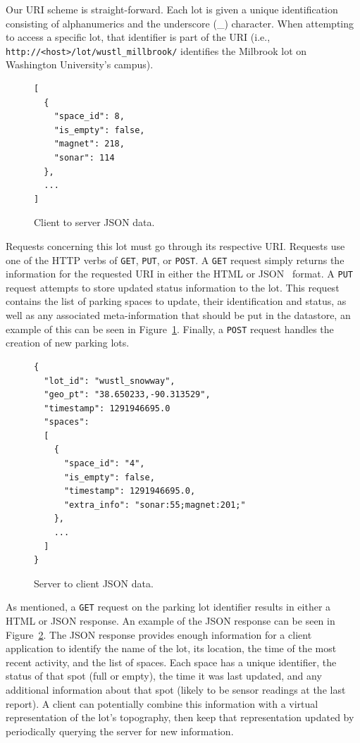 \documentclass{acm_proc}
\begin{document}
Our URI scheme is straight-forward.
Each lot is given a unique identification consisting of alphanumerics and
the underscore (\_) character.
When attempting to access a specific lot, that identifier is part of the
URI (i.e.,
\texttt{http://<host>/lot/wustl\_millbrook/}
identifies the Milbrook lot on Washington University's campus).

\begin{figure}
    \begin{verbatim}
[
  {
    "space_id": 8,
    "is_empty": false,
    "magnet": 218,
    "sonar": 114
  },
  ...
]
\end{verbatim}
	\caption{Client to server JSON data.}
	\label{fig:clientserverjson}
\end{figure}

Requests concerning this lot must go through its respective URI.
Requests use one of the HTTP verbs of \texttt{GET}, \texttt{PUT}, or
\texttt{POST}.
A \texttt{GET} request simply returns the information for the requested URI
in either the HTML or JSON~\cite{crockford:json} format.
A \texttt{PUT} request attempts to store updated status information to the
lot.
This request contains the list of parking spaces to update, their
identification and status, as well as any associated meta-information that
should be put in the datastore, an example of this can be seen in
Figure~\ref{fig:clientserverjson}.
Finally, a \texttt{POST} request handles the creation of new parking lots.

\begin{figure}
    \begin{verbatim}
{
  "lot_id": "wustl_snowway",
  "geo_pt": "38.650233,-90.313529",
  "timestamp": 1291946695.0
  "spaces":
  [
    {
      "space_id": "4",
      "is_empty": false,
      "timestamp": 1291946695.0,
      "extra_info": "sonar:55;magnet:201;"
    },
    ...
  ]
}
\end{verbatim}
	\caption{Server to client JSON data.}
	\label{fig:serverclientjson}
\end{figure}

As mentioned, a \texttt{GET} request on the parking lot identifier results
in either a HTML or JSON response.
An example of the JSON response can be seen in
Figure~\ref{fig:serverclientjson}.
The JSON response provides enough information for a client application to
identify the name of the lot, its location, the time of the most recent
activity, and the list of spaces.
Each space has a unique identifier, the status of that spot (full or
empty), the time it was last updated, and any additional information about
that spot (likely to be sensor readings at the last report).
A client can potentially combine this information with a virtual
representation of the lot's topography, then keep that representation
updated by periodically querying the server for new information.
\end{document}
